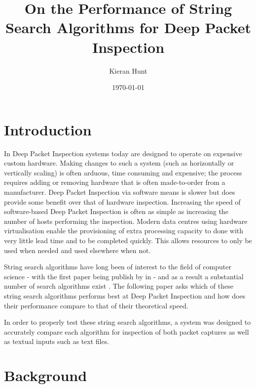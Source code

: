 \documentclass[11pt]{article}
\begin{document}
\title{On the Performance of String Search Algorithms for Deep Packet Inspection}
\author{Kieran Hunt}
\date{\today}
\maketitle


\section{Introduction}

In Deep Packet Inspection systems today are designed to operate on expensive custom hardware. Making changes to such a system (such as horizontally or vertically scaling) is often arduous, time consuming and expensive; the process requires adding or removing hardware that is often made-to-order from a manufacturer. Deep Packet Inspection via software means is slower but does provide some benefit over that of hardware inspection. Increasing the speed of software-based Deep Packet Inspection is often as simple as increasing the number of hosts performing the inspection. Modern data centres using hardware virtualisation enable the provisioning of extra processing capacity to done with very little lead time and to be completed quickly. This allows resources to only be used when needed and used elsewhere when not. 

String search algorithms have long been of interest to the field of computer science - with the first paper being publish by \citeauthor{morris1970} in \citeyear{morris1970} - and as a result a substantial number of search algorithms exist \cite{charras2004}. The following paper asks which of these string search algorithms performs best at Deep Packet Inspection and how does their performance compare to that of their theoretical speed.

In order to properly test these string search algorithms, a system was designed to accurately compare each algorithm for inspection of both packet captures as well as textual inputs such as text files.

\section{Background}
\end{document}
